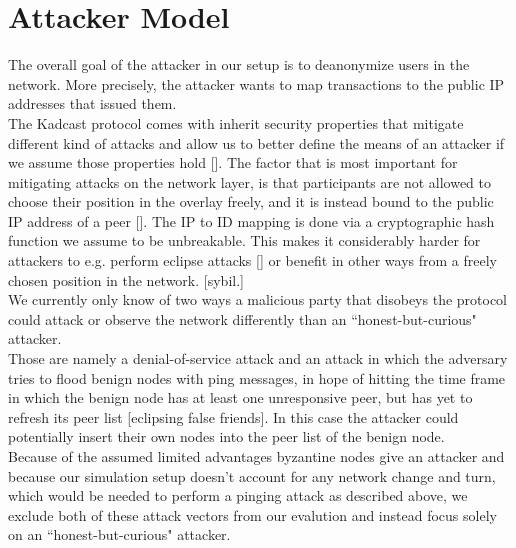 \section{Attacker Model}
The overall goal of the attacker in our setup is to deanonymize users in the network.
More precisely, the attacker wants to map transactions to the public IP addresses that issued them. \\
The Kadcast protocol comes with inherit security properties that mitigate different kind of attacks
and allow us to better define the means of an attacker if we assume those properties hold [].
The factor that is most important for mitigating attacks on the network layer, is that participants are
not allowed to choose their position in the overlay freely, and it is instead bound to the public IP address of a peer [].
The IP to ID mapping is done via a cryptographic hash function we assume to be unbreakable.
This makes it considerably harder for attackers to e.g. perform eclipse attacks [] or benefit in other ways from
a freely chosen position in the network. [sybil.] \\
We currently only know of two ways a malicious party that disobeys the protocol could attack or observe the network differently than
an ``honest-but-curious" attacker. \\
Those are namely a denial-of-service attack and an attack in which the adversary tries to flood
benign nodes with ping messages, in hope of hitting the time frame in which the benign node has at least one unresponsive
peer, but has yet to refresh its peer list [eclipsing false friends]. In
this case the attacker could potentially insert their own nodes into the
peer list of the benign node. \\
Because of the assumed limited advantages byzantine nodes give an attacker and because our simulation setup doesn't account for any network change and turn,
which would be needed to perform a pinging attack as described above,
we exclude both of these attack vectors from our evalution and instead focus solely on an ``honest-but-curious" attacker. \\

